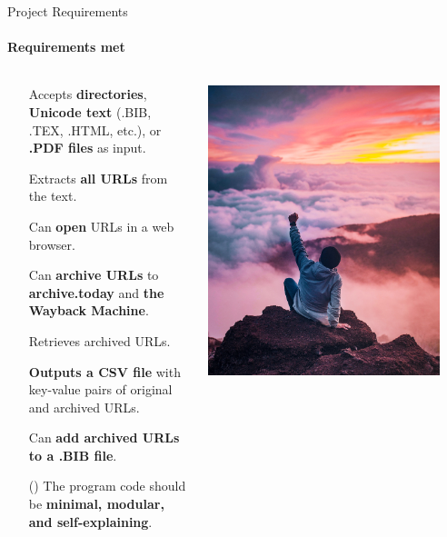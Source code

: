 \documentclass[
    ngerman,%
    authorontitle=true,
]{bfhbeamer}
\begin{document}
	\begin{frame}{Project Requirements}
		\framesubtitle{Requirements met}
		\begin{columns} %
			\begin{column}{0.7\textwidth} %
				\begin{itemize}
					\item[\checkmark] Accepts \textbf{directories}, \textbf{Unicode text} (.BIB, .TEX, .HTML, etc.), or \textbf{.PDF files} as input.
					\item[\checkmark] Extracts \textbf{all URLs} from the text.
					\item[\checkmark] Can \textbf{open} URLs in a web browser.
					\item[\checkmark] Can \textbf{archive URLs} to \textbf{archive.today} and \textbf{the Wayback Machine}.
					\item[\checkmark] Retrieves archived URLs.
					\item[\checkmark] \textbf{Outputs a CSV file} with key-value pairs of original and archived URLs.
					\item[\checkmark] Can \textbf{add archived URLs to a .BIB file}.
					\item[(\checkmark)] The program code should be \textbf{minimal, modular, and self-explaining}.
				\end{itemize}
				
			\end{column}
			\begin{column}{0.3\textwidth} %
				\begin{center}
					\includegraphics[width=0.9\textwidth]{pictures/final_presentation/achievement.jpg}
				\end{center}
			\end{column}
		\end{columns}
		

\end{frame}
\end{document}
